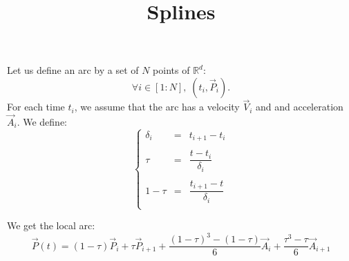 \documentclass[aps,onecolumn]{revtex4}
\begin{document}
\title{Splines}
\maketitle

Let us define an arc by a set of $N$ points of $\mathbb{R}^d$:
\begin{equation}
	\forall i \in [1:N],\;	(t_i,\vec{P}_i).
\end{equation}
For each time $t_i$, we assume that the arc has a velocity $\vec{V}_i$ and and acceleration $\vec{A}_i$.
We define:
\begin{equation}
\left\lbrace
\begin{array}{rcl}
	\delta_i & = & t_{i+1}-t_{i}\\
	\\
	\tau     & = & \dfrac{t-t_{i}}{\delta_i}\\
	\\
	1-\tau   & = & \dfrac{t_{i+1}-t}{\delta_i}\\
\end{array}
\right.
\end{equation}
		
We get the local arc:
\begin{equation}
	\vec{P}(t) = (1-\tau) \vec{P}_i + \tau \vec{P}_{i+1} + \dfrac{ (1-\tau)^3 - (1-\tau) }{6} \vec{A}_{i} + \dfrac{\tau^3-\tau}{6} \vec{A}_{i+1}
\end{equation}	
\end{document}
